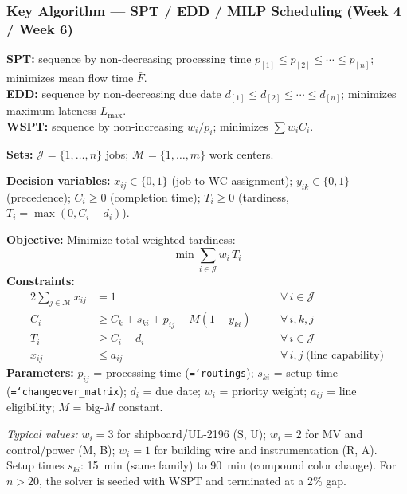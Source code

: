 \documentclass[11pt]{article}
\newcommand{\tfield}[1]{\texttt{\hyphenchar\font=`\-\relax #1}}
\begin{document}
\subsubsection*{Key Algorithm --- SPT / EDD / MILP Scheduling (Week 4 / Week 6)}

\begin{eqbox}
\textbf{SPT:} sequence by non-decreasing processing time $p_{[1]} \leq p_{[2]} \leq \cdots \leq p_{[n]}$; minimizes mean flow time $\bar{F}$.\\
\textbf{EDD:} sequence by non-decreasing due date $d_{[1]} \leq d_{[2]} \leq \cdots \leq d_{[n]}$; minimizes maximum lateness $L_{\max}$.\\
\textbf{WSPT:} sequence by non-increasing $w_i / p_i$; minimizes $\sum w_i C_i$.
\end{eqbox}

\begin{eqbox}
\textbf{Sets:} $\mathcal{J} = \{1, \ldots, n\}$ jobs;\; $\mathcal{M} = \{1, \ldots, m\}$ work centers.

\textbf{Decision variables:} $x_{ij} \in \{0,1\}$ (job-to-WC assignment);\; $y_{ik} \in \{0,1\}$ (precedence);\; $C_i \geq 0$ (completion time);\; $T_i \geq 0$ (tardiness, $T_i = \max(0, C_i - d_i)$).

\textbf{Objective:} Minimize total weighted tardiness:
\[
\min \sum_{i \in \mathcal{J}} w_i \, T_i
\]
\textbf{Constraints:}
\begin{alignat}{2}
\sum_{j \in \mathcal{M}} x_{ij} &= 1 &\quad& \forall\, i \in \mathcal{J} \\
C_i &\geq C_k + s_{ki} + p_{ij} - M(1 - y_{ki}) &\quad& \forall\, i,k,j \\
T_i &\geq C_i - d_i &\quad& \forall\, i \in \mathcal{J} \\
x_{ij} &\leq a_{ij} &\quad& \forall\, i,j \;\text{(line capability)}
\end{alignat}
\textbf{Parameters:} $p_{ij}$ = processing time (\tfield{routings});\; $s_{ki}$ = setup time (\tfield{changeover\_matrix});\; $d_i$ = due date;\; $w_i$ = priority weight;\; $a_{ij}$ = line eligibility;\; $M$ = big-$M$ constant.
\end{eqbox}

\textit{Typical values:} $w_i = 3$ for shipboard/UL-2196 (S, U); $w_i = 2$ for MV and control/power (M, B); $w_i = 1$ for building wire and instrumentation (R, A).  Setup times $s_{ki}$: 15~min (same family) to 90~min (compound color change).  For $n > 20$, the solver is seeded with WSPT and terminated at a 2\% gap.
\end{document}
